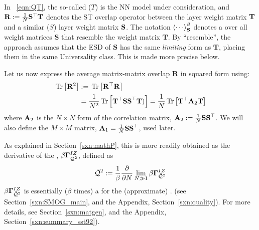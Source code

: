 In \EQN~\ref{eqn:QT}, the so-called \emph{\Teacher} ($T$) is the NN model under consideration,
and 
$\mathbf{R}:=\frac{1}{N}{\mathbf{S}^{\top}\mathbf{T}}$
denotes the ST overlap operator 
between the \Teacher layer weight matrix ${\mathbf{T}}$ and a similar \emph{\Student} ($S$) layer weight matrix ${\mathbf{S}}$.
The notation $\THRMAVGIZ{\cdots}$ denotes a \ThermalAverage over
all \Student weight matrices $\mathbf{S}$ that resemble the \Teacher weight matrix $\mathbf{T}$.
By ``resemble'', the \SETOL approach assumes that 
the ESD of $\mathbf{S}$ has the same \emph{limiting} form as $\mathbf{T}$, placing them in the same \HTSR Universality class.
This is made more precise below.

Let us now express the average matrix-matrix overlap $\mathbf{R}$ in squared form using:
\begin{align}
  \label{eqn:R2}
\mbox{}\operatorname{Tr}\left[\mathbf{R}^{2}\right] &:=\mbox{}\operatorname{Tr}\left[\mathbf{R}^{\top}\mathbf{R}\right]  \\ \nonumber
&=\frac{1}{N^{2}}\mbox{}\operatorname{Tr}\left[\mathbf{T}^{\top}\mathbf{SS}^{\top}\mathbf{T})\right]
=\frac{1}{N}\mbox{}\operatorname{Tr}\left[\mathbf{T}^{\top}\mathbf{A}_2\mathbf{T}\right]
\end{align}
where $\mathbf{A}_{2}$ is the $N\times N$ form of the \Student correlation matrix,
$\mathbf{A}_2:=\frac{1}{N}\mathbf{SS}^{\top}$.
We will also define the $M\times M$ matrix, $\mathbf{A}_{1}=\frac{1}{N}\mathbf{SS}^{\top}$,
used later.


As explained in Section~\ref{sxn:mathP}, this \QualitySquared is more readily obtained as 
the derivative of the \LayerQualitySquared \GeneratingFunction, $\beta\mathbf{\Gamma}^{IZ}_{\bar{\mathcal{Q}}^{2}}$, defined as
\begin{align}
  \label{eqn:IZG_QT}
  \bar{\mathcal{Q}}^{2} := \dfrac{1}{\beta}\dfrac{\partial }{\partial N} \lim_{N\gg 1}\beta\mathbf{\Gamma}^{IZ}_{\bar{\mathcal{Q}}^{2}}
\end{align}
$\beta\mathbf{\Gamma}^{IZ}_{\bar{\mathcal{Q}}^{2}}$ is essentially ($\beta$ times) a \emph{\FreeEnergy} for the (approximate) \LayerQualitySquared.
(see Section~\ref{sxn:SMOG_main}, and the Appendix, Section~\ref{sxn:quality}).
For more details, see Section~\ref{sxn:matgen}, and the Appendix, Section~\ref{sxn:summary_sst92}).

